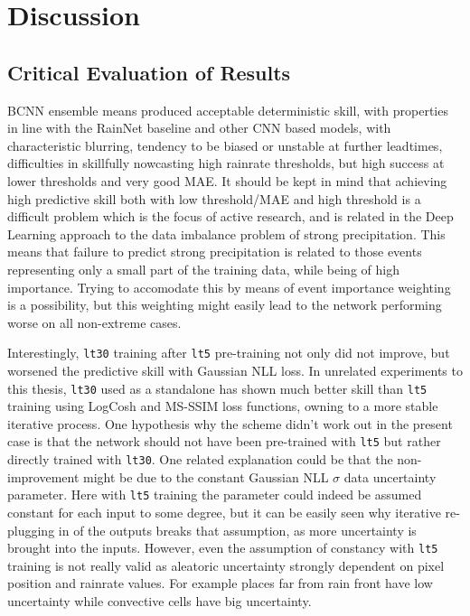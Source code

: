 \chapter{Discussion}
\label{chapter:discussion}


\section{Critical Evaluation of Results}


BCNN ensemble means produced acceptable deterministic skill, with properties in line with the RainNet baseline \cite{ayzel_rainnet_nodate} and other CNN based models, with characteristic blurring, tendency to be biased or unstable at further leadtimes, difficulties in skillfully nowcasting high rainrate thresholds, but high success at lower thresholds and very good MAE. It should be kept in mind that achieving high predictive skill both with low threshold/MAE and high threshold is a difficult problem which is the focus of active research, and is related in the Deep Learning approach to the data imbalance problem of strong precipitation. This means that failure to predict strong precipitation is related to those events representing only a small part of the training data, while being of high importance. Trying to accomodate this by means of event importance weighting is a possibility, but this weighting might easily lead to the network performing worse on all non-extreme cases.


Interestingly, \texttt{lt30} training after \texttt{lt5} pre-training not only did not improve, but worsened the predictive skill with Gaussian NLL loss. In unrelated experiments to this thesis, \texttt{lt30} used as a standalone has shown much better skill than \texttt{lt5} training using LogCosh and MS-SSIM loss functions, owning to a more stable iterative process. One hypothesis why the scheme didn't work out in the present case is that the network should not have been pre-trained with \texttt{lt5} but rather directly trained with \texttt{lt30}. One related explanation could be that the non-improvement might be due to the constant Gaussian NLL $\sigma$ data uncertainty parameter. Here with \texttt{lt5} training the parameter could indeed be assumed constant for each input to some degree, but it can be easily seen why iterative re-plugging in of the outputs breaks that assumption, as more uncertainty is brought into the inputs. However, even the assumption of constancy with \texttt{lt5} training is not really valid as aleatoric uncertainty strongly dependent on pixel position and rainrate values. For example places far from rain front have low uncertainty while convective cells have big uncertainty.

